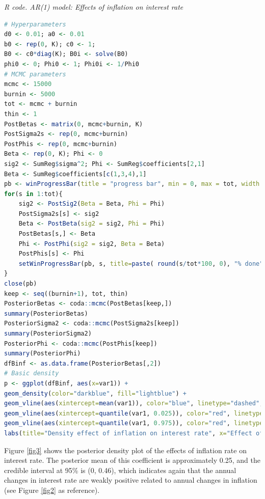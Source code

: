\begin{tcolorbox}[enhanced,width=4.67in,center upper,
	fontupper=\large\bfseries,drop shadow southwest,sharp corners]
	\textit{R code. AR(1) model: Effects of inflation on interest rate}
	\begin{VF}
		\begin{lstlisting}[language=R]
# Hyperparameters
d0 <- 0.01; a0 <- 0.01
b0 <- rep(0, K); c0 <- 1; 
B0 <- c0*diag(K); B0i <- solve(B0)
phi0 <- 0; Phi0 <- 1; Phi0i <- 1/Phi0
# MCMC parameters
mcmc <- 15000
burnin <- 5000
tot <- mcmc + burnin
thin <- 1
PostBetas <- matrix(0, mcmc+burnin, K)
PostSigma2s <- rep(0, mcmc+burnin)
PostPhis <- rep(0, mcmc+burnin)
Beta <- rep(0, K); Phi <- 0
sig2 <- SumReg$sigma^2; Phi <- SumReg$coefficients[2,1]
Beta <- SumReg$coefficients[c(1,3,4),1]
pb <- winProgressBar(title = "progress bar", min = 0, max = tot, width = 300)
for(s in 1:tot){
	sig2 <- PostSig2(Beta = Beta, Phi = Phi)
	PostSigma2s[s] <- sig2
	Beta <- PostBeta(sig2 = sig2, Phi = Phi)
	PostBetas[s,] <- Beta
	Phi <- PostPhi(sig2 = sig2, Beta = Beta)
	PostPhis[s] <- Phi
	setWinProgressBar(pb, s, title=paste( round(s/tot*100, 0), "% done"))
}
close(pb)
keep <- seq((burnin+1), tot, thin)
PosteriorBetas <- coda::mcmc(PostBetas[keep,])
summary(PosteriorBetas)
PosteriorSigma2 <- coda::mcmc(PostSigma2s[keep])
summary(PosteriorSigma2)
PosteriorPhi <- coda::mcmc(PostPhis[keep])
summary(PosteriorPhi)
dfBinf <- as.data.frame(PosteriorBetas[,2])
# Basic density
p <- ggplot(dfBinf, aes(x=var1)) + 
geom_density(color="darkblue", fill="lightblue") +
geom_vline(aes(xintercept=mean(var1)), color="blue", linetype="dashed", linewidth=1) +
geom_vline(aes(xintercept=quantile(var1, 0.025)), color="red", linetype="dashed", linewidth=1) +
geom_vline(aes(xintercept=quantile(var1, 0.975)), color="red", linetype="dashed", linewidth=1) +
labs(title="Density effect of inflation on interest rate", x="Effect of inflation", y = "Density")
\end{lstlisting}
	\end{VF}
\end{tcolorbox}

Figure \ref{fig3} shows the posterior density plot of the effects of inflation rate on interest rate. The posterior mean of this coefficient is approximately 0.25, and the credible interval at 95\% is (0, 0.46), which indicates again that the annual changes in interest rate are weakly positive related to annual changes in inflation (see Figure \ref{fig2} as reference). 

